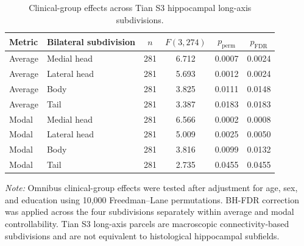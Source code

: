 \documentclass{article}
\begin{document}
\begin{table}[!htbp]
\centering
\caption{Clinical-group effects across Tian S3 hippocampal long-axis subdivisions.}
\label{tab:tableS2}
\footnotesize
\setlength{\tabcolsep}{5pt}

\begin{tabular}{@{}llcccc@{}}
\toprule
\textbf{Metric} &
\textbf{Bilateral subdivision} &
\textbf{$n$} &
\textbf{$F(3,274)$} &
\textbf{$p_{\mathrm{perm}}$} &
\textbf{$p_{\mathrm{FDR}}$} \\
\midrule
Average & Medial head  & 281 & 6.712 & 0.0007 & 0.0024 \\
Average & Lateral head & 281 & 5.693 & 0.0012 & 0.0024 \\
Average & Body         & 281 & 3.825 & 0.0111 & 0.0148 \\
Average & Tail         & 281 & 3.387 & 0.0183 & 0.0183 \\
\midrule
Modal  & Medial head  & 281 & 6.566 & 0.0002 & 0.0008 \\
Modal  & Lateral head & 281 & 5.009 & 0.0025 & 0.0050 \\
Modal  & Body         & 281 & 3.816 & 0.0099 & 0.0132 \\
Modal  & Tail         & 281 & 2.735 & 0.0455 & 0.0455 \\
\bottomrule
\end{tabular}

\vspace{1mm}

\footnotesize{\textit{Note:} Omnibus clinical-group effects were tested after
adjustment for age, sex, and education using 10,000 Freedman--Lane
permutations. BH-FDR correction was applied across the four subdivisions
separately within average and modal controllability. Tian S3 long-axis
parcels are macroscopic connectivity-based subdivisions and are not
equivalent to histological hippocampal subfields.}

\end{table}
\end{document}
